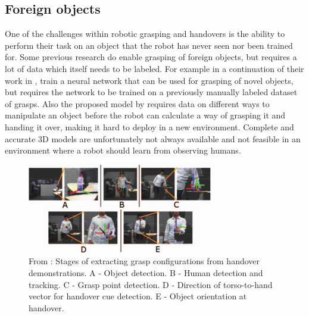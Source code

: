 \subsection{Foreign objects}
One of the challenges within robotic grasping and handovers is the ability to perform their task on an object that the robot has never seen nor been trained for. Some previous research do enable grasping of foreign objects, but requires a lot of data which itself needs to be labeled. For example \textcite{Huebner2008a} in a continuation of their work in \parencite{Huebner2008}, train a neural network that can be used for grasping of novel objects, but requires the network to be trained on a previously manually labeled dataset of grasps. Also the proposed model by \parencite{Chan2014} requires data on different ways to manipulate an object before the robot can calculate a way of grasping it and handing it over, making it hard to deploy in a new environment. Complete and accurate 3D models are unfortunately not always available and not feasible in an environment where a robot should learn from observing humans.

\begin{figure}
	\centering
	\includegraphics[width=\textwidth]{img/related-work/demonstrations.png}
	\caption{From \parencite{Chan2015a}: Stages of extracting grasp configurations from handover demonstrations. A - Object detection. B - Human detection and tracking. C - Grasp point detection. D - Direction of torso-to-hand vector for handover cue detection. E - Object orientation at handover.}
\end{figure}

